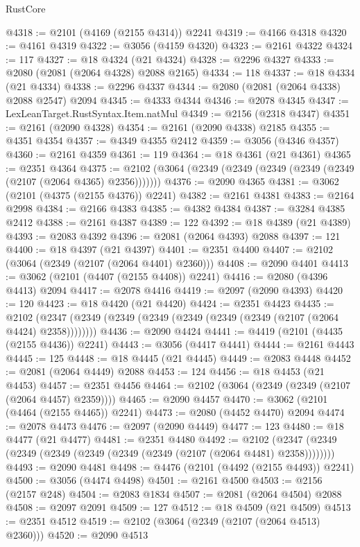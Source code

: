 \begin{lexlean}{RustCore}
\begin{coremodule}
@4318 := @2101 (@4169 (@2155 @4314)) @2241
@4319 := @4166 @4318
@4320 := @4161 @4319
@4322 := @3056 (@4159 @4320)
@4323 := @2161 @4322
@4324 := 117
@4327 := @18 @4324 (@21 @4324)
@4328 := @2296 @4327
@4333 := @2080 (@2081 (@2064 @4328) @2088 @2165)
@4334 := 118
@4337 := @18 @4334 (@21 @4334)
@4338 := @2296 @4337
@4344 := @2080 (@2081 (@2064 @4338) @2088 @2547) @2094
@4345 := @4333 @4344
@4346 := @2078 @4345
@4347 := LexLeanTarget.RustSyntax.Item.natMul
@4349 := @2156 (@2318 @4347)
@4351 := @2161 (@2090 @4328)
@4354 := @2161 (@2090 @4338) @2185
@4355 := @4351 @4354
@4357 := @4349 @4355 @2412
@4359 := @3056 (@4346 @4357)
@4360 := @2161 @4359
@4361 := 119
@4364 := @18 @4361 (@21 @4361)
@4365 := @2351 @4364
@4375 := @2102 (@3064 (@2349 (@2349 (@2349 (@2349 (@2349 (@2107 (@2064 @4365) @2356)))))))
@4376 := @2090 @4365
@4381 := @3062 (@2101 (@4375 (@2155 @4376)) @2241)
@4382 := @2161 @4381
@4383 := @2164 @2998
@4384 := @2166 @4383
@4385 := @4382 @4384
@4387 := @3284 @4385 @2412
@4388 := @2161 @4387
@4389 := 122
@4392 := @18 @4389 (@21 @4389)
@4393 := @2083 @4392
@4396 := @2081 (@2064 @4393) @2088
@4397 := 121
@4400 := @18 @4397 (@21 @4397)
@4401 := @2351 @4400
@4407 := @2102 (@3064 (@2349 (@2107 (@2064 @4401) @2360)))
@4408 := @2090 @4401
@4413 := @3062 (@2101 (@4407 (@2155 @4408)) @2241)
@4416 := @2080 (@4396 @4413) @2094
@4417 := @2078 @4416
@4419 := @2097 (@2090 @4393)
@4420 := 120
@4423 := @18 @4420 (@21 @4420)
@4424 := @2351 @4423
@4435 := @2102 (@2347 (@2349 (@2349 (@2349 (@2349 (@2349 (@2349 (@2107 (@2064 @4424) @2358))))))))
@4436 := @2090 @4424
@4441 := @4419 (@2101 (@4435 (@2155 @4436)) @2241)
@4443 := @3056 (@4417 @4441)
@4444 := @2161 @4443
@4445 := 125
@4448 := @18 @4445 (@21 @4445)
@4449 := @2083 @4448
@4452 := @2081 (@2064 @4449) @2088
@4453 := 124
@4456 := @18 @4453 (@21 @4453)
@4457 := @2351 @4456
@4464 := @2102 (@3064 (@2349 (@2349 (@2107 (@2064 @4457) @2359))))
@4465 := @2090 @4457
@4470 := @3062 (@2101 (@4464 (@2155 @4465)) @2241)
@4473 := @2080 (@4452 @4470) @2094
@4474 := @2078 @4473
@4476 := @2097 (@2090 @4449)
@4477 := 123
@4480 := @18 @4477 (@21 @4477)
@4481 := @2351 @4480
@4492 := @2102 (@2347 (@2349 (@2349 (@2349 (@2349 (@2349 (@2349 (@2107 (@2064 @4481) @2358))))))))
@4493 := @2090 @4481
@4498 := @4476 (@2101 (@4492 (@2155 @4493)) @2241)
@4500 := @3056 (@4474 @4498)
@4501 := @2161 @4500
@4503 := @2156 (@2157 @248)
@4504 := @2083 @1834
@4507 := @2081 (@2064 @4504) @2088
@4508 := @2097 @2091
@4509 := 127
@4512 := @18 @4509 (@21 @4509)
@4513 := @2351 @4512
@4519 := @2102 (@3064 (@2349 (@2107 (@2064 @4513) @2360)))
@4520 := @2090 @4513

\end{coremodule}
\end{lexlean}
